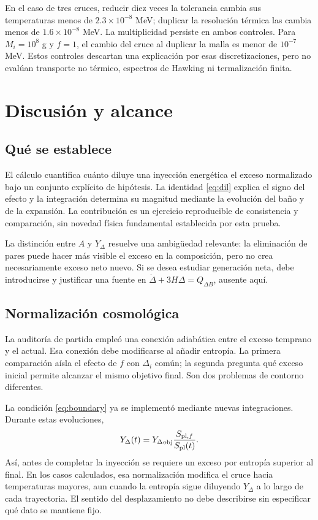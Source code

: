 \documentclass[10pt,twocolumn,a4paper]{article}
\newcommand{\Y}{{Y_\Delta}}
\begin{document}
En el caso de tres cruces, reducir diez veces la tolerancia cambia sus temperaturas menos de $2.3\times10^{-8}$ MeV; duplicar la resolución térmica las cambia menos de $1.6\times10^{-8}$ MeV. La multiplicidad persiste en ambos controles. Para $M_i=10^8$ g y $f=1$, el cambio del cruce al duplicar la malla es menor de $10^{-7}$ MeV. Estos controles descartan una explicación por esas discretizaciones, pero no evalúan transporte no térmico, espectros de Hawking ni termalización finita.

\section{Discusión y alcance}
\subsection{Qué se establece}
El cálculo cuantifica cuánto diluye una inyección energética el exceso normalizado bajo un conjunto explícito de hipótesis. La identidad \eqref{eq:dil} explica el signo del efecto y la integración determina su magnitud mediante la evolución del baño y de la expansión. La contribución es un ejercicio reproducible de consistencia y comparación, sin novedad física fundamental establecida por esta prueba.

La distinción entre $A$ y $\Y$ resuelve una ambigüedad relevante: la eliminación de pares puede hacer más visible el exceso en la composición, pero no crea necesariamente exceso neto nuevo. Si se desea estudiar generación neta, debe introducirse y justificar una fuente en $\dot\Delta+3H\Delta=Q_{\Delta B}$, ausente aquí.

\subsection{Normalización cosmológica}
La auditoría de partida empleó una conexión adiabática entre el exceso temprano y el actual. Esa conexión debe modificarse al añadir entropía. La primera comparación aísla el efecto de $f$ con $\Delta_i$ común; la segunda pregunta qué exceso inicial permite alcanzar el mismo objetivo final. Son dos problemas de contorno diferentes.

La condición \eqref{eq:boundary} ya se implementó mediante nuevas integraciones. Durante estas evoluciones,
\begin{equation}
\Y(t)=\Y_{\rm obj}\frac{S_{{\rm pl},f}}{S_{\rm pl}(t)}.
\end{equation}
Así, antes de completar la inyección se requiere un exceso por entropía superior al final. En los casos calculados, esa normalización modifica el cruce hacia temperaturas mayores, aun cuando la entropía sigue diluyendo $\Y$ a lo largo de cada trayectoria. El sentido del desplazamiento no debe describirse sin especificar qué dato se mantiene fijo.
\end{document}

